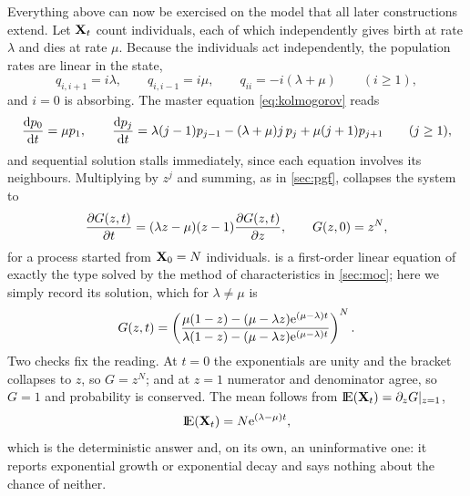Everything above can now be exercised on the model that all later constructions extend.
Let ${{\bf X}_t}$ count individuals, each of which independently gives birth at rate $\lambda$
and dies at rate $\mu$. Because the individuals act independently, the population rates
are linear in the state,
\begin{equation}
\label{eq:lbdrates}
q_{i,i+1} = i\lambda,
\qquad
q_{i,i-1} = i\mu,
\qquad
q_{ii} = -i(\lambda+\mu)
\qquad (i\ge1),
\end{equation}
and $i=0$ is absorbing. The master equation \cref{eq:kolmogorov} reads
\begin{equation}
\label{eq:lbdmaster}
\displaystyle\frac{{\rm d} p_0}{{\rm d} t} = \mu p_1,
\qquad
\displaystyle\frac{{\rm d} p_j}{{\rm d} t} = \lambda(j-1)p_{j-1} - (\lambda+\mu)j\,p_j + \mu(j+1)p_{j+1}
\qquad (j\ge1),
\end{equation}
and sequential solution stalls immediately, since each equation involves its
neighbours. Multiplying by $z^j$ and summing, as in \cref{sec:pgf}, collapses the system
to
\begin{equation}
\label{eq:lbdpde}
\displaystyle\frac{\partial G(z,t)}{\partial t} = (\lambda z-\mu)(z-1)\displaystyle\frac{\partial G(z,t)}{\partial z},
\qquad
G(z,0) = z^N ,
\end{equation}
for a process started from ${\bf X}_0=N$ individuals.  is a first-order
linear equation of exactly the type solved by the method of characteristics in
\cref{sec:moc}; here we simply record its solution, which for $\lambda\neq\mu$ is
\begin{equation}
\label{eq:lbdG}
G(z,t) = \left(\frac{\mu(1-z) - (\mu-\lambda z){\rm e}^{(\mu-\lambda)t}}
                   {\lambda(1-z) - (\mu-\lambda z){\rm e}^{(\mu-\lambda)t}}\right)^{N}.
\end{equation}
Two checks fix the reading. At $t=0$ the exponentials are unity and the bracket
collapses to $z$, so $G=z^N$; and at $z=1$ numerator and denominator agree, so $G=1$ and
probability is conserved. The mean follows from ${\rm I}\!{\rm E}({{\bf X}_t}) = \partial_z G|_{z=1}$,
\begin{equation}
\label{eq:lbdmean}
{\rm I}\!{\rm E}({{\bf X}_t}) = N{\rm e}^{(\lambda-\mu)t},
\end{equation}
which is the deterministic answer and, on its own, an uninformative one: it reports
exponential growth or exponential decay and says nothing about the chance of neither.

